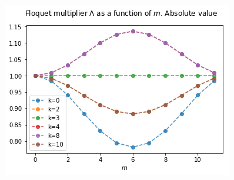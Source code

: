 \documentclass[a4paper,12pt]{article}
\begin{document}
\begin{figure}[h]
    \centering
    \includegraphics[width=.55\textwidth]{assets/theory-2019-08-27-182315374-a22.png}
\end{figure}

\clearpage
\end{document}
